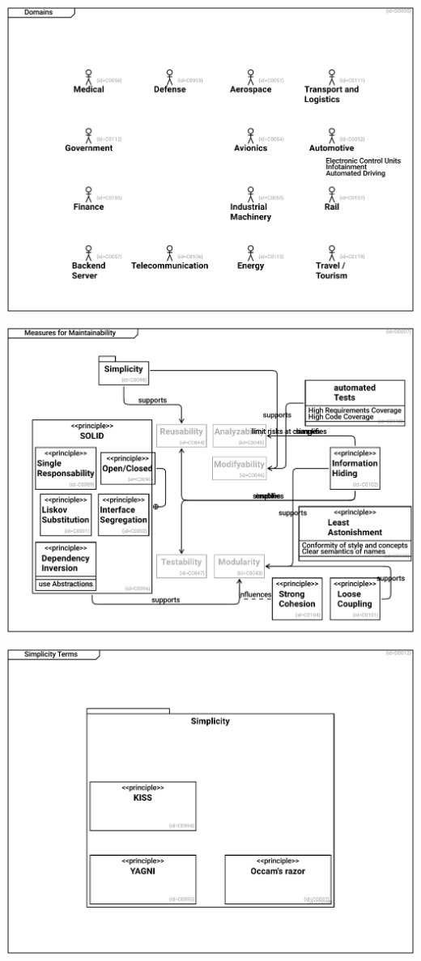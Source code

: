 \documentclass{article}
\begin{document}
\includegraphics[width= 1.0\linewidth]{quality_export/D0005_Domains.pdf}


\includegraphics[width= 1.0\linewidth]{quality_export/D0007_Measures_for_Maintainability.pdf}


\includegraphics[width= 1.0\linewidth]{quality_export/D0012_Simplicity_Terms.pdf}

\end{document}
